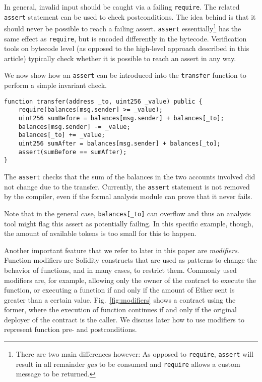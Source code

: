 In general, invalid input should be caught via a failing \texttt{require}.
The related \texttt{assert} statement can be used to check postconditions.
The idea behind is that it should never be possible to reach a failing
assert.
\texttt{assert} essentially\footnote{There are two main differences however: As opposed to \texttt{require},
\texttt{assert} will result in all remainder \emph{gas} to be consumed and \texttt{require} allows a custom message to be returned.}
has the same effect as \texttt{require}, but
is encoded differently in the bytecode. Verification tools on bytecode
level (as opposed to the high-level approach described in this article)
typically check whether it is possible to reach an assert in any way.

We now show how an \texttt{assert} can be introduced into the \texttt{transfer} function
to perform a simple invariant check.
\begin{verbatim}
function transfer(address _to, uint256 _value) public {
    require(balances[msg.sender] >= _value);
    uint256 sumBefore = balances[msg.sender] + balances[_to];
    balances[msg.sender] -= _value;
    balances[_to] += _value;
    uint256 sumAfter = balances[msg.sender] + balances[_to];
    assert(sumBefore == sumAfter);
}
\end{verbatim}

The \texttt{assert} checks that the sum of the balances in the two
accounts involved did not change due to the transfer. Currently,
the \texttt{assert} statement is not removed by the compiler, even
if the formal analysis module can prove that it never fails.

Note that in the general case, \verb+balances[_to]+ can overflow
and thus an analysis tool might flag this assert as potentially
failing. In this specific example, though, the amount of available tokens
is too small for this to happen.

Another important feature that we refer to later in this paper are
\emph{modifiers}.
%
Function modifiers are Solidity constructs that are used as patterns to
change the behavior of functions, and in many cases, to restrict them.
%
Commonly used modifiers are, for example, allowing only the owner of the
contract to execute the function, or executing a function if and only if the
amount of Ether sent is greater than a certain value.
%
Fig.~\ref{fig:modifiers} shows a contract using the former, where the
execution of function  continues if and only if the original deployer
of the contract is the caller.
%
We discuss later how to use modifiers to represent function pre- and
postconditions.

